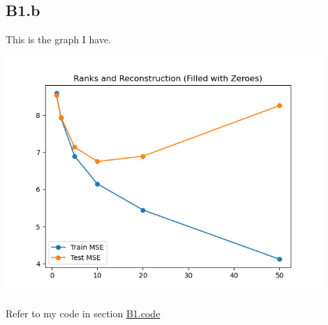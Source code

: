 \documentclass[]{article}
\begin{document}
    \subsection*{B1.b}
        This is the graph I have. 
        \begin{center}
            \includegraphics*[width=12cm]{16-13-38-b1-b.png}
        \end{center} 
        Refer to my code in section \hyperref[B1.code]{B1.code}
\end{document}
